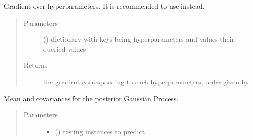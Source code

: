 \documentclass[letterpaper,10pt,english]{sphinxmanual}
\begin{document}
\begin{fulllineitems}
\begin{fulllineitems}
\begin{quote}
\begin{description}
\end{description}\end{quote}

\end{fulllineitems}


\begin{fulllineitems}
\label{\detokenize{index:bo.surrogates.gaussian_process.GaussianProcess.param_grad}}
Gradient over hyperparameters. It is recommended to use  instead.
\begin{quote}\begin{description}
\item[{Parameters}] \leavevmode
{} () \textendash{} dictionary with keys being hyperparameters and values their queried values

\item[{Returns}] \leavevmode
the gradient corresponding to each hyperparameters, order given by 

\end{description}\end{quote}

\end{fulllineitems}


\begin{fulllineitems}
\label{\detokenize{index:bo.surrogates.gaussian_process.GaussianProcess.predict}}
Mean and covariances for the posterior Gaussian Process.
\begin{quote}\begin{description}
\item[{Parameters}] \leavevmode\begin{itemize}
\item {} 
 (\sphinxstyleliteralemphasis{, }\sphinxstyleliteralemphasis{(}\sphinxstyleliteralemphasis{(}\sphinxstyleliteralemphasis{, }\sphinxstyleliteralemphasis{)}\sphinxstyleliteralemphasis{)}) \textendash{} testing instances to predict


\end{itemize}
\end{description}
\end{quote}
\end{fulllineitems}
\end{fulllineitems}
\end{document}
